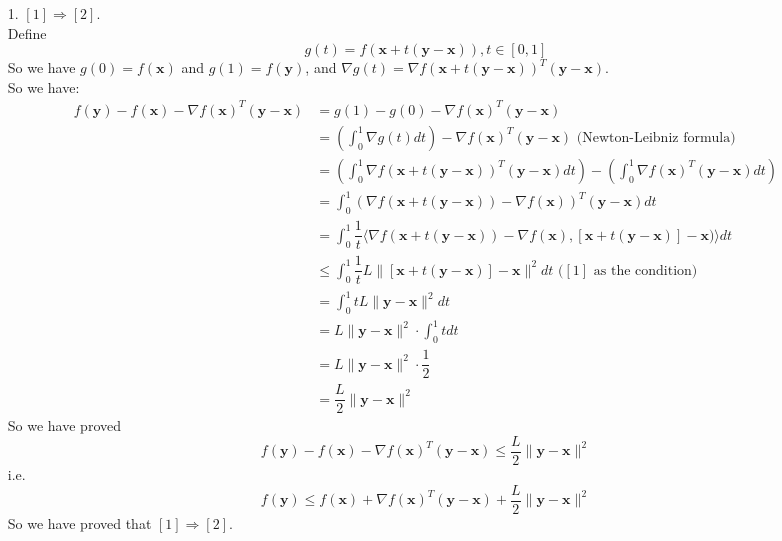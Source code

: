 \solution{}
\begin{itemize}
    \item[1.] $[1] \Rightarrow[2]$.\\
Define $$g(t)=f\left(\mathbf{x}+t(\mathbf{y}-\mathbf{x})\right),t\in[0,1]$$
So we have $g(0)=f(\mathbf{x})$ and $g(1)=f(\mathbf{y})$, and $\nabla g(t)=\nabla f(\mathbf{x}+t(\mathbf{y}-\mathbf{x}))^T(\mathbf{y}-\mathbf{x})$.\\
So we have:
\begin{align*}
    f(\mathbf{y}) - f(\mathbf{x}) -\nabla f(\mathbf{x})^T(\mathbf{y}-\mathbf{x}) &= g(1)-g(0)-\nabla f(\mathbf{x})^T(\mathbf{y}-\mathbf{x}) \\
    &= \left(\int_{0}^{1}\nabla g(t)dt\right)-\nabla f(\mathbf{x})^T(\mathbf{y}-\mathbf{x}) \text{\ \ \ \ \ (Newton-Leibniz formula)}\\
    &= \left(\int_{0}^{1}\nabla f(\mathbf{x}+t(\mathbf{y}-\mathbf{x}))^T(\mathbf{y}-\mathbf{x})dt\right)-\left(\int_{0}^{1}\nabla f(\mathbf{x})^T(\mathbf{y}-\mathbf{x})dt\right) \\
    &= \int_{0}^{1}\left(\nabla f(\mathbf{x}+t(\mathbf{y}-\mathbf{x}))-\nabla f(\mathbf{x})\right)^T(\mathbf{y}-\mathbf{x})dt \\
    &= \int_{0}^{1}\dfrac{1}{t}\langle\nabla f(\mathbf{x}+t(\mathbf{y}-\mathbf{x}))-\nabla f(\mathbf{x}),[\mathbf{x}+t(\mathbf{y}-\mathbf{x})]-\mathbf{x})\rangle dt \\
    &\leq \int_{0}^{1}\dfrac{1}{t}L\|[\mathbf{x}+t(\mathbf{y}-\mathbf{x})]-\mathbf{x}\|^2dt \text{\ \ \ \ \ \ \ \ \ \ ($[1]$ as the condition)}\\
    &= \int_{0}^{1}tL\|\mathbf{y}-\mathbf{x}\|^2dt \\
    &= L\|\mathbf{y}-\mathbf{x}\|^2\cdot \int_{0}^{1}tdt \\
    &= L\|\mathbf{y}-\mathbf{x}\|^2\cdot \dfrac{1}{2} \\
    &= \dfrac{L}{2}\|\mathbf{y}-\mathbf{x}\|^2
\end{align*}
So we have proved
$$f(\mathbf{y}) - f(\mathbf{x}) -\nabla f(\mathbf{x})^T(\mathbf{y}-\mathbf{x})\leq  \dfrac{L}{2}\|\mathbf{y}-\mathbf{x}\|^2$$
i.e.
$$f(\mathbf{y}) \leq f(\mathbf{x})+\nabla f(\mathbf{x})^T(\mathbf{y}-\mathbf{x})+\frac{L}{2}\|\mathbf{y}-\mathbf{x}\|^2$$
So we have proved that $[1] \Rightarrow[2]$.
    


\end{itemize}
